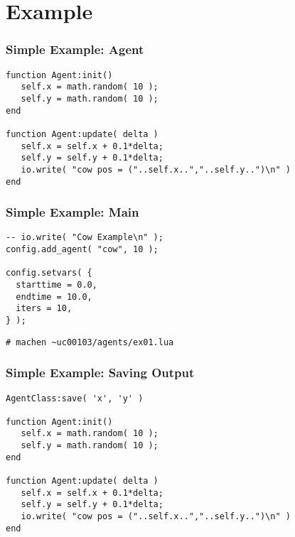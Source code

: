 \documentclass{beamer}
\begin{document}
\section{Example}

\begin{frame}[fragile]
  \frametitle{Simple Example: Agent}
\begin{lstlisting}[style=agentlang,caption=cow.lua]
function Agent:init()
   self.x = math.random( 10 );
   self.y = math.random( 10 );
end

function Agent:update( delta )
   self.x = self.x + 0.1*delta;
   self.y = self.y + 0.1*delta;
   io.write( "cow pos = ("..self.x..","..self.y..")\n" )
end
\end{lstlisting}
\end{frame}

\begin{frame}[fragile]
  \frametitle{Simple Example: Main}
\begin{lstlisting}[style=agentlang,caption=ex01.lua]
-- io.write( "Cow Example\n" );
config.add_agent( "cow", 10 );

config.setvars( {
  starttime = 0.0,
  endtime = 10.0,
  iters = 10,
} );
\end{lstlisting}
  
\begin{lstlisting}[style=console]
# machen ~uc00103/agents/ex01.lua
\end{lstlisting}
\end{frame}

\begin{frame}[fragile]
  \frametitle{Simple Example: Saving Output}
\begin{lstlisting}[style=agentlang,caption=cow.lua]
AgentClass:save( 'x', 'y' )

function Agent:init()
   self.x = math.random( 10 );
   self.y = math.random( 10 );
end

function Agent:update( delta )
   self.x = self.x + 0.1*delta;
   self.y = self.y + 0.1*delta;
   io.write( "cow pos = ("..self.x..","..self.y..")\n" )
end
\end{lstlisting}
\end{frame}
\end{document}
